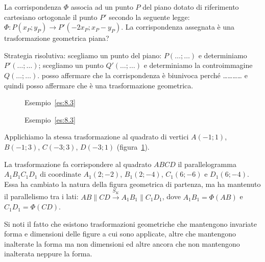 \begin{exrig}
\begin{esempio}\label{es:8.3}
La corrispondenza \(\Phi\) associa ad un punto \(P\) del piano dotato di 
riferimento cartesiano ortogonale il punto \(P'\) secondo la seguente 
legge:
\(\Phi : P(x_P;y_P) \rightarrow P'(-2x_P;x_P-y_P)\). La corrispondenza 
assegnata è una trasformazione geometrica piana?\vspace{7pt}

Strategia risolutiva: 
scegliamo un punto del piano: \(P(\ldots{};\ldots{})\) e determiniamo 
\(P'(\ldots{};\ldots{})\);
scegliamo un punto \(Q'(\ldots{};\ldots{})\) e determiniamo la 
controimmagine \(Q(\ldots{};\ldots{})\).
posso affermare che la corrispondenza è biunivoca perché 
\ldots\ldots\ldots\ldots{} e quindi posso affermare che è una 
trasformazione geometrica.


\begin{inaccessibleblock}
 \begin{figure}[!htb]
\begin{center}
 \noindent\begin{minipage}{0.49\textwidth}
    \centering
	\caption{Esempio~\ref{es:8.3}}\label{fig:es8.3a}
 \end{minipage}
 \noindent\begin{minipage}{0.49\textwidth}
    \centering
    \caption{Esempio~\ref{es:8.3}}\label{fig:es8.3b}
 \end{minipage}
\end{center}
\end{figure}
\end{inaccessibleblock}


Applichiamo la stessa trasformazione al quadrato di vertici 
\(A(-1;1)\), \(B(-1;3)\), \(C(-3;3)\), \(D(-3;1)\) (figura~\ref{fig:es8.3b}).

La trasformazione fa corrispondere al quadrato \(ABCD\) il 
parallelogramma \(A_1B_1C_1D_1\) di coordinate \(A_1(2;-2)\), 
\(B_1(2;-4)\), \(C_1(6;-6)\) e \(D_1(6;-4)\). Essa ha cambiato la natura 
della figura geometrica di partenza, ma ha mantenuto il parallelismo 
tra i lati: \(AB\parallel CD \overset{S_K}{\rightarrow} A_1B_1\parallel 
C_1D_1\), dove \(A_1B_1=\Phi(AB)\) e \(C_1D_1=\Phi(CD)\).
\end{esempio}
\end{exrig}

Si noti il fatto che esistono trasformazioni geometriche che 
mantengono invariate forma e dimensioni delle figure a cui sono 
applicate, altre che mantengono inalterate la forma ma non dimensioni 
ed altre ancora che non mantengono inalterata neppure la forma.

